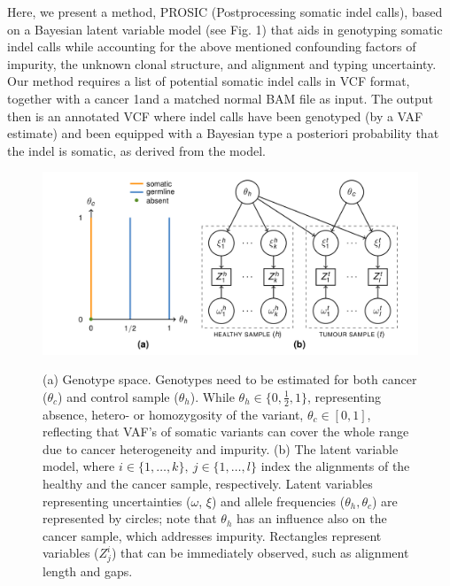Here, we present a method, PROSIC (Postprocessing somatic indel calls), based on a Bayesian
latent variable model (see Fig. 1) that aids in genotyping somatic indel calls while accounting for the above
mentioned confounding factors of impurity, the unknown clonal structure, and alignment and typing uncertainty. Our method requires a list of potential somatic indel calls in VCF format, together with a cancer
1and a matched normal BAM file as input. The output then is an annotated VCF where indel calls have been
genotyped (by a VAF estimate) and been equipped with a Bayesian type a posteriori probability that the
indel is somatic, as derived from the model.

\begin{figure}[htb]
\begin{center}
        \includegraphics[scale=0.3]{all/13.png}
\label{fig:fig}
\caption{(a) Genotype space. Genotypes need to be estimated for both cancer ($\theta_c$) and control sample ($\theta_h$). While
$\theta_h\in \{0, \frac{1}{2} , 1\}$, representing absence, hetero- or homozygosity of the variant, $\theta_c\in [0, 1]$, reflecting that
VAF’s of somatic variants can cover the whole range due to cancer heterogeneity and impurity. (b) The
latent variable model, where $i\in\{1, \ldots, k\}, ~j\in\{1, \ldots, l\}$ index the alignments of the healthy and the cancer
sample, respectively. Latent variables representing uncertainties ($\omega$, $\xi$) and allele frequencies ($\theta_h,\theta_c$) are
represented by circles; note that $\theta_h$ has an influence also on the cancer sample, which addresses impurity.
Rectangles represent variables ($Z^i_j$) that can be immediately observed, such as alignment length and gaps.}
\end{center}
\end{figure}

